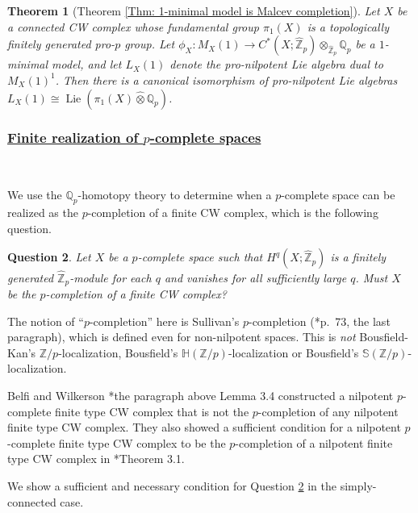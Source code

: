 \documentclass[11pt]{amsart}
\newtheorem{theorem}{Theorem}[section]
\newtheorem{question}[theorem]{Question}
\theoremstyle{definition}
\numberwithin{equation}{section}
\numberwithin{equation}{section}
\newcommand\QQ{\mathbb{Q}}
\newcommand\ZZ{\mathbb{Z}}
\DeclareMathOperator{\Lie}{Lie}
\begin{document}
\begin{theorem}[Theorem \ref{Thm: 1-minimal model is Malcev completion}]
Let $X$ be a connected CW complex whose fundamental group $\pi_1(X)$ is a topologically finitely generated pro-$p$ group. Let $\phi_X:M_X(1)\rightarrow C^*(X;\widehat{\ZZ}_p)\otimes_{\widehat{\ZZ}_p}\QQ_p$ be a $1$-minimal model, and let $L_X(1)$ denote the pro-nilpotent Lie algebra dual to $M_X(1)^1$. Then there is a canonical isomorphism of pro-nilpotent Lie algebras $L_X(1)\cong \Lie(\pi_1(X)\widehat{\otimes} \QQ_p)$.
\end{theorem}

\subsubsection*{\underline{Finite realization of $p$-complete spaces}}\,

We use the $\QQ_p$-homotopy theory to determine when a $p$-complete space can be realized as the $p$-completion of a finite CW complex, which is the following question. 

\begin{question}\label{Question: finite CW complex realization for p-complete space}
Let $X$ be a $p$-complete space such that $H^q(X;\widehat{\ZZ}_p)$ is a finitely generated $\widehat{\ZZ}_p$-module for each $q$ and vanishes for all sufficiently large $q$. Must $X$ be the $p$-completion of a finite CW complex?
\end{question}

The notion of ``$p$-completion'' here is Sullivan's $p$-completion (\cite{Sullivan-MIT-notes}*{p.~73, the last paragraph}), which is defined even for non-nilpotent spaces. This is \textit{not} Bousfield-Kan's $\ZZ/p$-localization, Bousfield's $\mathbb{H}(\ZZ/p)$-localization or Bousfield's $\mathbb{S}(\ZZ/p)$-localization.

Belfi and Wilkerson \cite{Victor-Wilkerson-Counterexample-p-completion}*{the paragraph above Lemma 3.4} constructed a nilpotent $p$-complete finite type CW complex that is not the $p$-completion of any nilpotent finite type CW complex. They also showed a sufficient condition for a nilpotent $p$-complete finite type CW complex to be the $p$-completion of a nilpotent finite type CW complex in \cite{Victor-Wilkerson-Counterexample-p-completion}*{Theorem 3.1}.

We show a sufficient and necessary condition for Question \ref{Question: finite CW complex realization for p-complete space} in the simply-connected case. 
\end{document}
